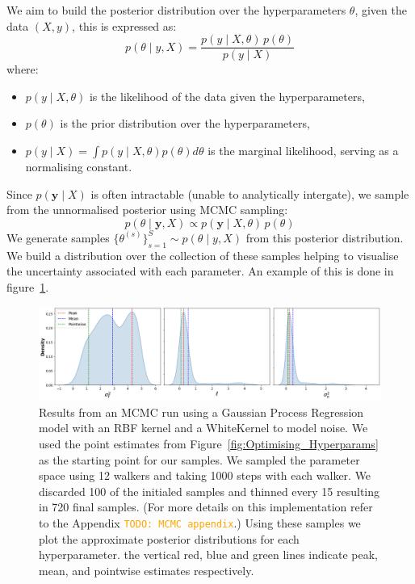\documentclass{ucdgradtaughtthesis}
\newcommand{\todo}[1]{\textcolor{orange}{\texttt{TODO: #1}}}
\begin{document}
We aim to build the posterior distribution over the hyperparameters \( \theta \), given the data \((X, y)\), this is expressed as:
%
\begin{equation}
p(\theta \mid y, X) = \frac{p(y \mid X, \theta) \, p(\theta)}{p(y \mid X)}
\end{equation}
where:
\begin{itemize}
    \item \( p(y \mid X, \theta) \) is the likelihood of the data given the hyperparameters,
    \item \( p(\theta) \) is the prior distribution over the hyperparameters,
    \item \( p(y \mid X) = \int p(y \mid X,\theta)p(\theta)d\theta \) is the marginal likelihood, serving as a normalising constant.
\end{itemize}
Since \( p(\mathbf{y} \mid X) \) is often intractable (unable to analytically intergate), we sample from the unnormalised posterior using MCMC sampling:
\begin{equation}
p(\theta \mid \mathbf{y}, X) \propto p(\mathbf{y} \mid X, \theta) \, p(\theta)
\end{equation}
%
We generate samples \( \{\theta^{(s)}\}_{s=1}^S \sim p(\theta \mid y, X) \) from this posterior distribution.
We build a distribution over the collection of these samples helping to visualise the uncertainty associated with each parameter. 
An example of this is done in figure~\ref{fig:MCMCresults}.
\begin{figure}[H]
    \centering
    \includegraphics[width=\textwidth]{LatexPlots/1dplots/MCMCdistribution.png}
    \caption[Visualising the posterior distribution of the hyper-parameters using MCMC.]{
    Results from an MCMC run using a Gaussian Process Regression model with an RBF kernel and a WhiteKernel to model noise. We used the point estimates from Figure~\ref{fig:Optimising_Hyperparams} as the starting point 
    for our samples. We sampled the parameter space using 12 walkers and taking 1000 steps with each walker. We discarded 100 of the initialed samples and thinned every 15 resulting in 720 final samples. 
    (For more details on this implementation refer to the Appendix \todo{MCMC appendix}.)
    Using these samples we plot the approximate posterior distributions for each hyperparameter. 
    the vertical red, blue and green lines indicate peak, mean, and pointwise estimates respectively.}
    \label{fig:MCMCresults}
\end{figure}
%
\end{document}
